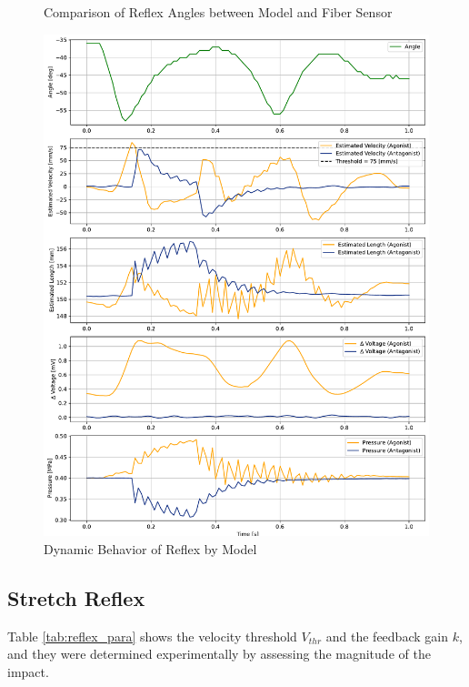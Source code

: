 \begin{figure}[t]
\begin{minipage}[H]{\textwidth}
\begin{minipage}[H]{0.48\textwidth}
            \caption{Comparison of Reflex Angles between Model and Fiber Sensor}
            \label{fig:reflex_angle}
        \end{minipage}
        \hfill
        \begin{minipage}[H]{0.48\textwidth} 
            \centering
            \includegraphics[width=\columnwidth]{fig/20240819_r20_reflex_all_plt.pdf}
            \caption{Dynamic Behavior of Reflex by Model}
            \label{fig:reflex_all}
        \end{minipage}
    \end{minipage}
\end{figure}
\subsection{Stretch Reflex}
Table \ref{tab:reflex_para} shows the velocity threshold $V_{thr}$ and the feedback gain $k$, and they were determined experimentally by assessing the magnitude of the impact. 


